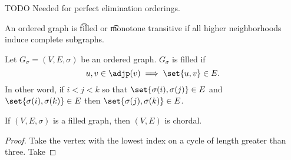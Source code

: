 
\sbasic


































\sstart
{}


TODO
Needed for perfect elimination orderings.


An ordered graph is \t{filled} or \t{monotone transitive} if all higher neighborhoods induce complete subgraphs.


Let $G_{\sigma} = (V, E, \sigma)$ be an ordered graph.
$G_{\sigma}$ is filled if
$$
  u, v \in \adjp(v) \implies \set{u, v} \in E.
$$
In other word, if $i < j < k$ so that $\set{\sigma(i), \sigma(j)} \in E$ and $\set{\sigma(i), \sigma(k)} \in E$ then $\set{\sigma(j), \sigma(k)} \in E$.


\begin{prop}
  If $(V, E, \sigma)$ is a filled graph, then $(V, E)$ is chordal.

  \begin{proof}
  Take the vertex with the lowest index on a cycle of length greater than three.
  Take
  \end{proof}
\end{prop}
\strats
